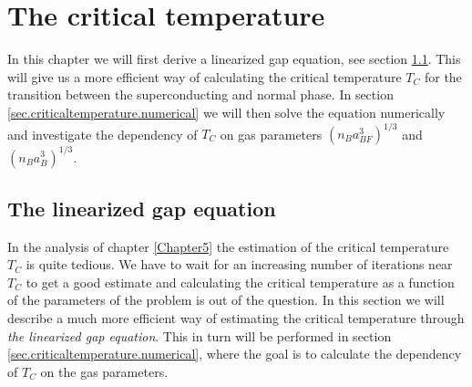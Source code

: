 
\chapter{The critical temperature} %

\label{Chapter6} %


In this chapter we will first derive a linearized gap equation, see section \ref{sec.linearizedgapequation}. This will give us a more efficient way of calculating the critical temperature $T_C$ for the transition between the superconducting and normal phase. In section \ref{sec.criticaltemperature.numerical} we will then solve the equation numerically and investigate the dependency of $T_C$ on gas parameters $(n_Ba_{BF}^3)^{1/3}$ and $(n_Ba_B^3)^{1/3}$. 

\section{The linearized gap equation} \label{sec.linearizedgapequation}
In the analysis of chapter \ref{Chapter5} the estimation of the critical temperature $T_C$ is quite tedious. We have to wait for an increasing number of iterations near $T_C$ to get a good estimate and calculating the critical temperature as a function of the parameters of the problem is out of the question. In this section we will describe a much more efficient way of estimating the critical temperature through \textit{the linearized gap equation}. This in turn will be performed in section \ref{sec.criticaltemperature.numerical}, where the goal is to calculate the dependency of $T_C$ on the gas parameters.

